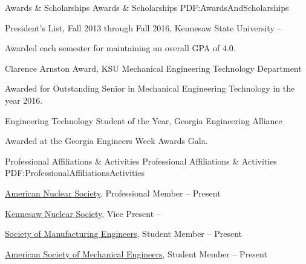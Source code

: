 \documentclass[letterpaper,MMMyyyy,nonstopmode]{simpleresumecv}
\begin{document}
\begin{Body}

\Section
{Awards \&\newline
Scholarships}
{Awards \& Scholarships}
{PDF:AwardsAndScholarships}

\BulletItem
President's List,
Fall 2013 through Fall 2016,
Kennesaw State University
\hfill
{} --
\begin{Detail}
\Item
Awarded each semester for maintaining an overall GPA of 4.0.
\end{Detail}

\Gap
\BulletItem
Clarence Arnston Award,
KSU Mechanical Engineering Technology Department
\hfill
{}
\begin{Detail}
\Item
Awarded for Outstanding Senior in Mechanical Engineering Technology in the year 2016.
\end{Detail}

\Gap
\BulletItem
Engineering Technology Student of the Year,
Georgia Engineering Alliance
\hfill
{}
\begin{Detail}
\Item
Awarded at the Georgia Engineers Week Awards Gala.
\end{Detail}



\Section
{Professional Affiliations\newline
\& Activities}
{Professional Affiliations \& Activities}
{PDF:ProfessionalAffiliationsActivities}

\BulletItem
\href{http://www.ans.org/}
{American Nuclear Society},
Professional Member
\hfill
{} -- Present

\BulletItem
\href{https://owllife.kennesaw.edu/organization/KNS}
{Kennesaw Nuclear Society},
Vice Present
\hfill
{} -- 

\BulletItem
\href{http://www.sme.org/}
{Society of Manufacturing Engineers},
Student Member
\hfill
{} -- Present

\BulletItem
\href{http://www.asme.org/}
{American Society of Mechanical Engineers},
Student Member
\hfill
{} -- Present




\end{Body}
\end{document}
